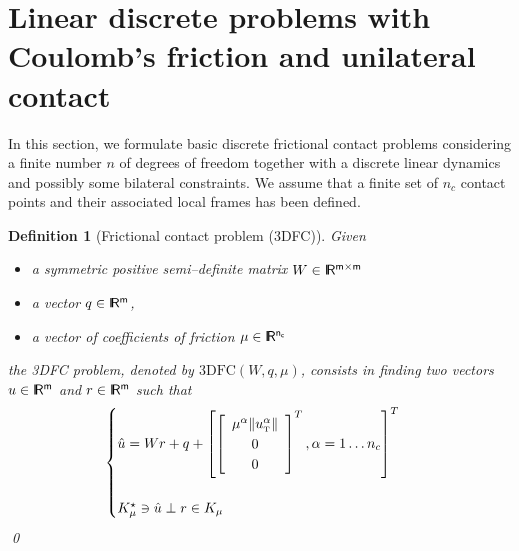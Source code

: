\documentclass[twoside]{article}
\def\t{{\hbox{\tiny{T}}}}
\newcommand{\RR}{\ensuremath{\rm\sf I\!R}}
\begin{document}
\clearpage
\section{Linear discrete problems with Coulomb's friction and unilateral contact}
In this section, we formulate basic discrete frictional contact problems considering a finite number $n$ of degrees of freedom  together with a discrete linear dynamics and possibly some bilateral constraints. We assume that a finite set of $n_c$ contact points and their associated local frames has been defined.

\newtheorem{definition}{Definition}

\begin{definition}[Frictional contact problem (3DFC)]
  Given
  \begin{itemize}
    \item a symmetric positive semi--definite  matrix ${W} \in \RR^{m \times m}$
    \item a vector $ {q} \in \RR^m$,
    \item a vector of coefficients of friction $\mu \in \RR^{n_c}$
  \end{itemize}
 the  3DFC problem, denoted by $\mathrm{3DFC}(W,q,\mu)$, consists in finding two vectors $u\in\RR^m$ and $r\in \RR^m$ such that
\begin{equation}\label{eq:3dfc}
  \begin{cases}
    \hat u = W r + q +\left[
      \left[\begin{array}{c}
          \mu^\alpha \|u^\alpha_\t\|\\
          0 \\
          0
        \end{array}\right]^T, \alpha = 1 \ldots n_c
    \right]^T \\ \\
    K^\star_{\mu} \ni {\hat u} \perp r \in K_{\mu}
  \end{cases}
\end{equation}
\qed
\end{definition}
\end{document}
